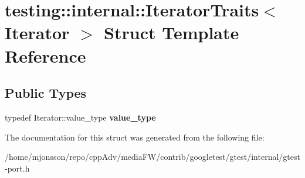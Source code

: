 \hypertarget{structtesting_1_1internal_1_1IteratorTraits}{}\section{testing\+:\+:internal\+:\+:Iterator\+Traits$<$ Iterator $>$ Struct Template Reference}
\label{structtesting_1_1internal_1_1IteratorTraits}
\subsection*{Public Types}
\begin{DoxyCompactItemize}
\item 
\mbox{\label{structtesting_1_1internal_1_1IteratorTraits_a29de4320a9c53ce438d3561b94e515bb}} 
typedef Iterator\+::value\+\_\+type {\bfseries value\+\_\+type}
\end{DoxyCompactItemize}


The documentation for this struct was generated from the following file\+:\begin{DoxyCompactItemize}
\item 
/home/mjonsson/repo/cpp\+Adv/media\+F\+W/contrib/googletest/gtest/internal/gtest-\/port.\+h\end{DoxyCompactItemize}
